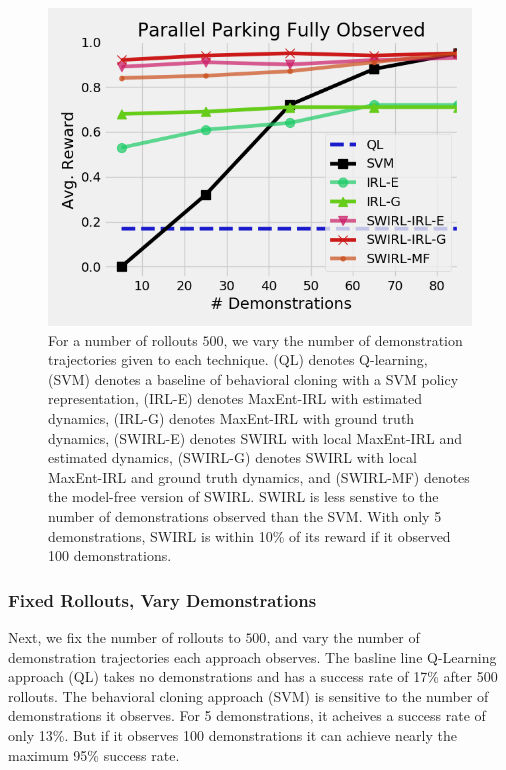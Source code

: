 \begin{figure}[t]
\centering
 \includegraphics[width=\columnwidth]{new-exp/pp-fo2.png}
 \caption{For a number of rollouts $500$, we vary the number of demonstration trajectories given to each technique. (QL) denotes Q-learning, (SVM) denotes a baseline of behavioral cloning with a SVM policy representation, (IRL-E) denotes MaxEnt-IRL with estimated dynamics, (IRL-G) denotes MaxEnt-IRL with ground truth dynamics, (SWIRL-E) denotes SWIRL with local MaxEnt-IRL and estimated dynamics, (SWIRL-G) denotes SWIRL with local MaxEnt-IRL and ground truth dynamics, and (SWIRL-MF) denotes the model-free version of SWIRL. SWIRL is less senstive to the number of demonstrations observed than the SVM. With only 5 demonstrations, SWIRL is within 10\% of its reward if it observed 100 demonstrations. \label{exp:pp-fo2}}
\end{figure}

\subsubsection{Fixed Rollouts, Vary Demonstrations}
Next, we fix the number of rollouts to $500$, and vary the number of demonstration trajectories each approach observes.
The basline line Q-Learning approach (QL) takes no demonstrations and has a success rate of 17\% after 500 rollouts.
The behavioral cloning approach (SVM) is sensitive to the number of demonstrations it observes. 
For 5 demonstrations, it acheives a success rate of only 13\%.
But if it observes 100 demonstrations it can achieve nearly the maximum 95\% success rate.

